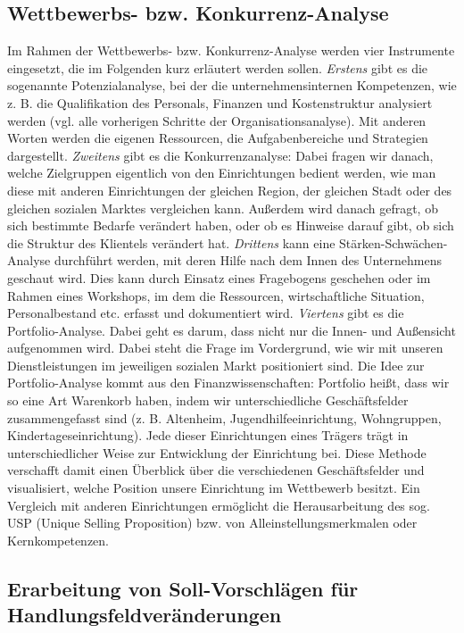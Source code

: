 \documentclass[
  letterpaper,
]{book}
\begin{document}
\subsection{Wettbewerbs- bzw.
Konkurrenz-Analyse}\label{wettbewerbs--bzw.-konkurrenz-analyse}

Im Rahmen der Wettbewerbs- bzw. Konkurrenz-Analyse werden vier
Instrumente eingesetzt, die im Folgenden kurz erläutert werden sollen.
\emph{Erstens} gibt es die sogenannte Potenzialanalyse, bei der die
unternehmensinternen Kompetenzen, wie z. B. die Qualifikation des
Personals, Finanzen und Kostenstruktur analysiert werden (vgl. alle
vorherigen Schritte der Organisationsanalyse). Mit anderen Worten werden
die eigenen Ressourcen, die Aufgabenbereiche und Strategien dargestellt.
\emph{Zweitens} gibt es die Konkurrenzanalyse: Dabei fragen wir danach,
welche Zielgruppen eigentlich von den Einrichtungen bedient werden, wie
man diese mit anderen Einrichtungen der gleichen Region, der gleichen
Stadt oder des gleichen sozialen Marktes vergleichen kann. Außerdem wird
danach gefragt, ob sich bestimmte Bedarfe verändert haben, oder ob es
Hinweise darauf gibt, ob sich die Struktur des Klientels verändert hat.
\emph{Drittens} kann eine Stärken-Schwächen-Analyse durchführt werden,
mit deren Hilfe nach dem Innen des Unternehmens geschaut wird. Dies kann
durch Einsatz eines Fragebogens geschehen oder im Rahmen eines
Workshops, im dem die Ressourcen, wirtschaftliche Situation,
Personalbestand etc. erfasst und dokumentiert wird. \emph{Viertens} gibt
es die Portfolio-Analyse. Dabei geht es darum, dass nicht nur die Innen-
und Außensicht aufgenommen wird. Dabei steht die Frage im Vordergrund,
wie wir mit unseren Dienstleistungen im jeweiligen sozialen Markt
positioniert sind. Die Idee zur Portfolio-Analyse kommt aus den
Finanzwissenschaften: Portfolio heißt, dass wir so eine Art Warenkorb
haben, indem wir unterschiedliche Geschäftsfelder zusammengefasst sind
(z. B. Altenheim, Jugendhilfeeinrichtung, Wohngruppen,
Kindertageseinrichtung). Jede dieser Einrichtungen eines Trägers trägt
in unterschiedlicher Weise zur Entwicklung der Einrichtung bei. Diese
Methode verschafft damit einen Überblick über die verschiedenen
Geschäftsfelder und visualisiert, welche Position unsere Einrichtung im
Wettbewerb besitzt. Ein Vergleich mit anderen Einrichtungen ermöglicht
die Herausarbeitung des sog. USP (Unique Selling Proposition) bzw. von
Alleinstellungsmerkmalen oder Kernkompetenzen.

\subsection{Erarbeitung von Soll-Vorschlägen für
Handlungsfeldveränderungen}\label{erarbeitung-von-soll-vorschluxe4gen-fuxfcr-handlungsfeldveruxe4nderungen}
\end{document}
